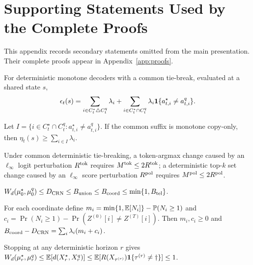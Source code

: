 \section{Supporting Statements Used by the Complete Proofs}
\label{app:supporting}

This appendix records secondary statements omitted from the main presentation. Their complete proofs appear in Appendix~\ref{app:proofs}.

\begin{theorem}
\label{thm:exact}
For deterministic monotone decoders with a common tie-break, evaluated at a shared state $s$,
\[
\epsilon_t(s)=
\sum_{i\in C_t^\star\triangle C_t^q}\lambda_i
+\sum_{i\in C_t^\star\cap C_t^q}\lambda_i
\mathbf{1}\{a_{t,i}^\star\ne a_{t,i}^q\}.
\]
\end{theorem}

\begin{proposition}
\label{prop:persistent-token}
Let $I=\{i\in C_t^\star\cap C_t^q:a_{t,i}^\star\ne a_{t,i}^q\}$. If the common suffix is monotone copy-only, then $\eta_t(s)\ge\sum_{i\in I}\lambda_i$.
\end{proposition}

\begin{lemma}
\label{lem:margin-main}
Under common deterministic tie-breaking, a token-argmax change caused by an $\ell_\infty$ logit perturbation $R^{\rm tok}$ requires $M^{\rm tok}\le2R^{\rm tok}$; a deterministic top-$k$ set change caused by an $\ell_\infty$ score perturbation $R^{\rm pol}$ requires $M^{\rm pol}\le2R^{\rm pol}$.
\end{lemma}

\begin{theorem}
\label{thm:coord}
$W_{d}(\mu_0^\star,\mu_0^q)\le D_{\mathrm{CRN}}\le B_{\rm union}\le B_{\rm coord}\le\min\{1,B_{\rm tel}\}$.
\end{theorem}

\begin{proposition}
\label{prop:gap}
For each coordinate define $m_i=\min\{1,\mathbb{E}[N_i]\}-\mathbb{P}(N_i\ge1)$ and
$c_i=\Pr(N_i\ge1)-\Pr(Z^{(0)}[i]\ne Z^{(T)}[i])$. Then $m_i,c_i\ge0$ and
$B_{\rm coord}-D_{\mathrm{CRN}}=\sum_i\lambda_i(m_i+c_i)$.
\end{proposition}

\begin{corollary}
\label{cor:fs-horizon}
Stopping at any deterministic horizon $r$ gives
$W_{d}(\mu_r^\star,\mu_r^q)\le\mathbb{E}[d(X_r^\star,X_r^q)]\le
\mathbb{E}[R(X_{\tau^{(r)}})\mathbf{1}\{\tau^{(r)}\ne\dagger\}]\le1$.
\end{corollary}



